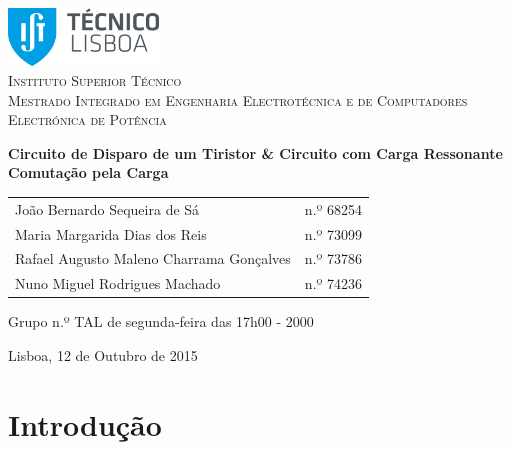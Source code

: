 \documentclass[a4paper,11pt]{article}
\numberwithin{equation}{section}
\begin{document}
\begin{titlepage}
\begin{center}

\hfill \break
\hfill \break

\includegraphics[width=0.3\textwidth]{img/logo}~\\[1cm] 

\textsc{\LARGE Instituto Superior Técnico}\\[0.25cm]
\textsc{\Large Mestrado Integrado em Engenharia Electrotécnica e de Computadores}\\[1.8cm]
\textsc{\huge Electrónica de Potência}\\[0.25cm]

\vspace{6mm}

{\huge \bfseries Circuito de Disparo de um Tiristor \linebreak \& \linebreak Circuito com Carga Ressonante \linebreak Comutação pela Carga  \\[1cm]}

\begin{tabular}{ l l }
	João Bernardo Sequeira de Sá & \hspace{2mm} n.º 68254 \\
	Maria Margarida Dias dos Reis & \hspace{2mm} n.º 73099 \\
	Rafael Augusto Maleno Charrama Gonçalves & \hspace{2mm} n.º 73786 \\
	Nuno Miguel Rodrigues Machado & \hspace{2mm} n.º 74236
\end{tabular}

\vspace{7mm}

Grupo n.º TAL de segunda-feira das 17h00 - 2000

\vfill

{\large Lisboa, 12 de Outubro de 2015} 
	
\end{center}
\end{titlepage}
	
\tableofcontents
\pagebreak

\section{Introdução}
\end{document}
